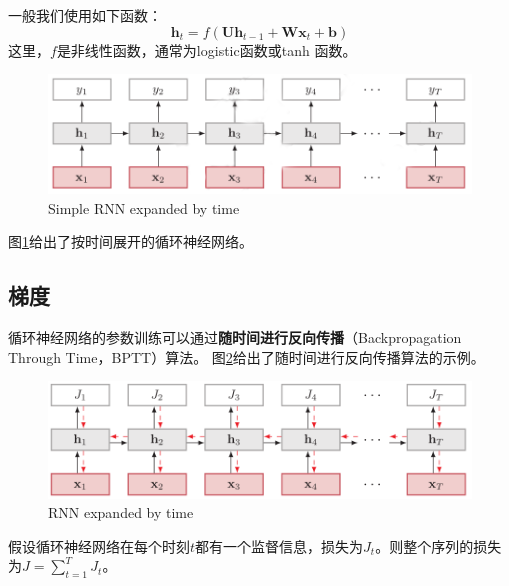 \documentclass[11pt,fleqn, UTF8]{ctexbook} %
\begin{document}
一般我们使用如下函数：
\begin{equation}\label{7.2}
  \boldsymbol{h}_t=f(\boldsymbol{U}\boldsymbol{h}_{t-1}+\boldsymbol{W}\boldsymbol{x}_t+\boldsymbol{b})
\end{equation}
这里，$f$是非线性函数，通常为logistic函数或tanh 函数。
\begin{figure}[t]
 \centering
 \includegraphics{pics/72.png}
 \caption{Simple RNN expanded by time}
 \label{fig:7.2}
\end{figure}

图\ref{fig:7.2}给出了按时间展开的循环神经网络。
\subsection{梯度}
循环神经网络的参数训练可以通过\textbf{随时间进行反向传播}（Backpropagation Through Time，BPTT）算法\cite{werbos1990backpropagation}。 图\ref{fig:7.3}给出了随时间进行反向传播算法的示例。
\begin{figure}[t]
 \centering
 \includegraphics{pics/73.png}
 \caption{RNN expanded by time}
 \label{fig:7.3}
\end{figure}

假设循环神经网络在每个时刻$t$都有一个监督信息，损失为$J_t$。则整个序列的损失为$J=\sum_{t=1}^TJ_t$。
\end{document}
